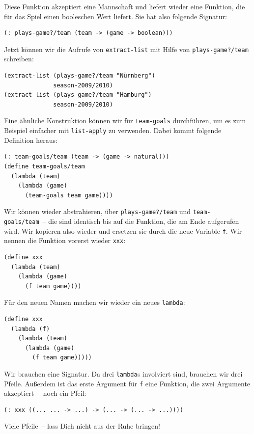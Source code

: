 Diese Funktion akzeptiert eine Mannschaft und liefert wieder eine
Funktion, die für das Spiel einen booleschen Wert liefert.  Sie hat
also folgende Signatur:
%
\begin{lstlisting}
(: plays-game?/team (team -> (game -> boolean)))
\end{lstlisting}
%
Jetzt können wir die Aufrufe von \lstinline{extract-list} mit
Hilfe von \lstinline{plays-game?/team} schreiben:
%
\begin{lstlisting}
(extract-list (plays-game?/team "Nürnberg")
              season-2009/2010)
(extract-list (plays-game?/team "Hamburg")
              season-2009/2010)
\end{lstlisting}
%
Eine ähnliche Konstruktion können wir für \lstinline{team-goals}
durchführen, um es zum Beispiel einfacher mit \lstinline{list-apply}
zu verwenden.  Dabei kommt folgende Definition heraus:
%
\begin{lstlisting}
(: team-goals/team (team -> (game -> natural)))
(define team-goals/team
  (lambda (team)
    (lambda (game)
      (team-goals team game))))
\end{lstlisting}
%
Wir können wieder
abstrahieren, über \lstinline{plays-game?/team} und
\lstinline{team-goals/team}~-- die sind identisch bis auf die Funktion,
die am Ende aufgerufen wird.  Wir kopieren also wieder und ersetzen
sie durch die neue Variable \lstinline{f}.  Wir nennen die Funktion
vorerst wieder \lstinline{xxx}:
%
\begin{lstlisting}
(define xxx
  (lambda (team)
    (lambda (game)
      (f team game))))
\end{lstlisting}
%
Für den neuen Namen machen wir wieder ein neues \lstinline{lambda}:
%
\begin{lstlisting}
(define xxx
  (lambda (f)
    (lambda (team)
      (lambda (game)
        (f team game)))))
\end{lstlisting}
%
Wir brauchen eine Signatur.  Da drei \lstinline{lambda}s involviert
sind, brauchen wir drei Pfeile.
Außerdem ist das erste Argument für \lstinline{f} eine Funktion, die
zwei Argumente akzeptiert~-- noch ein Pfeil:
%
\begin{lstlisting}
(: xxx ((... ... -> ...) -> (... -> (... -> ...))))
\end{lstlisting}
%
Viele Pfeile~-- lass Dich nicht aus der Ruhe bringen!

